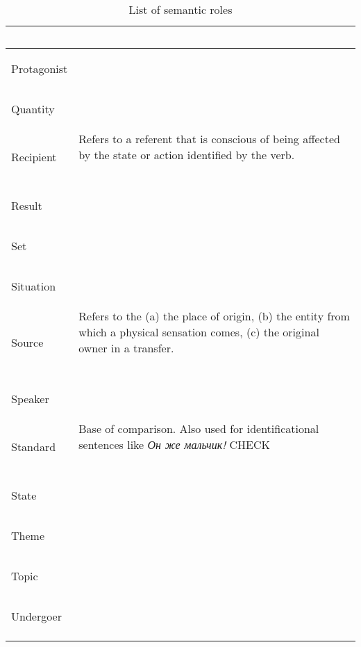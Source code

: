 \documentclass[a4paper,11pt, onecolumn,twoside]{article}
\begin{document}
\begin{longtable}{ p{}  p{} }
        & ~ \\
\midrule
 \multirow{2}{*}{Protagonist} & ~ \\ %
        & ~ \\
\midrule
 \multirow{2}{*}{Quantity} & ~ \\  %
        & ~ \\
\midrule
 \multirow{2}{*}{Recipient} & Refers to a referent that is conscious of being affected by the state or action identified by the verb. \\ 
        & ~ \\
\midrule
 \multirow{2}{*}{Result} & ~ \\ 
        & ~ \\
\midrule
 \multirow{2}{*}{Set} & ~ \\ 
        & ~ \\
\midrule
 \multirow{2}{*}{Situation} & ~ \\ 
        & ~ \\
\midrule
 \multirow{2}{*}{Source} & Refers to the (a) the place of origin, (b) the entity from which a physical sensation comes, (c) the original owner in a transfer. \\ 
        & ~ \\
\midrule
 \multirow{2}{*}{Speaker} & ~ \\ 
        & ~ \\
\midrule
 \multirow{2}{*}{Standard} & Base of comparison. Also used for identificational sentences like \emph{Он же мальчик!} CHECK \\ %
        & ~ \\
\midrule
 \multirow{2}{*}{State} & ~ \\ 
        & ~ \\
\midrule
 \multirow{2}{*}{Theme} & ~ \\ 
        & ~ \\
\midrule
 \multirow{2}{*}{Topic} & ~ \\  %
        & ~ \\
\midrule
 \multirow{2}{*}{Undergoer} & ~ \\ %
        & ~ \\
\bottomrule
\caption{List of semantic roles}
\label{table:semroles}
\end{longtable}
\end{document}
